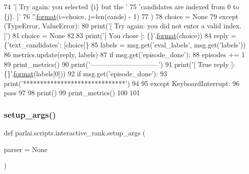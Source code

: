 \begin{DoxyCode}
74                             \textcolor{stringliteral}{'[ Try again: you selected \{i\} but the '}
75                             \textcolor{stringliteral}{'candidates are indexed from 0 to \{j\}. ]'}
76                             \textcolor{stringliteral}{''}.\hyperlink{namespaceparlai_1_1chat__service_1_1services_1_1messenger_1_1shared__utils_a32e2e2022b824fbaf80c747160b52a76}{format}(i=choice, j=len(cands) - 1)
77                         )
78                         choice = \textcolor{keywordtype}{None}
79                 \textcolor{keywordflow}{except} (TypeError, ValueError):
80                     print(\textcolor{stringliteral}{'[ Try again: you did not enter a valid index. ]'})
81                     choice = \textcolor{keywordtype}{None}
82 
83             print(\textcolor{stringliteral}{'[ You chose ]: \{\}'}.\hyperlink{namespaceparlai_1_1chat__service_1_1services_1_1messenger_1_1shared__utils_a32e2e2022b824fbaf80c747160b52a76}{format}(choice))
84             reply = \{\textcolor{stringliteral}{'text\_candidates'}: [choice]\}
85             labels = msg.get(\textcolor{stringliteral}{'eval\_labels'}, msg.get(\textcolor{stringliteral}{'labels'}))
86             metrics.update(reply, labels)
87             \textcolor{keywordflow}{if} msg.get(\textcolor{stringliteral}{'episode\_done'}):
88                 episodes += 1
89             print\_metrics()
90             print(\textcolor{stringliteral}{'------------------------------'})
91             print(\textcolor{stringliteral}{'[ True reply ]: \{\}'}.\hyperlink{namespaceparlai_1_1chat__service_1_1services_1_1messenger_1_1shared__utils_a32e2e2022b824fbaf80c747160b52a76}{format}(labels[0]))
92             \textcolor{keywordflow}{if} msg.get(\textcolor{stringliteral}{'episode\_done'}):
93                 print(\textcolor{stringliteral}{'******************************'})
94 
95     \textcolor{keywordflow}{except} KeyboardInterrupt:
96         \textcolor{keywordflow}{pass}
97 
98     print()
99     print\_metrics()
100 
101 
\end{DoxyCode}
\mbox{\label{namespaceparlai_1_1scripts_1_1interactive__rank_af87c6b5d3f8843e51461c9cfd75fd510}} 
\subsubsection{\texorpdfstring{setup\+\_\+args()}{setup\_args()}}
{\footnotesize\ttfamily def parlai.\+scripts.\+interactive\+\_\+rank.\+setup\+\_\+args (\begin{DoxyParamCaption}\item[{}]{parser = {\ttfamily None} }\end{DoxyParamCaption})}



